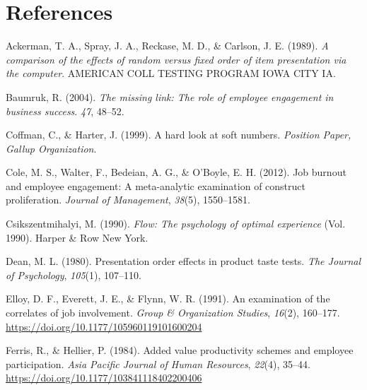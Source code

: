 \documentclass[
  man]{apa6}
\newlength{\cslhangindent}
\newlength{\cslentryspacingunit} %
\newenvironment{CSLReferences}[2] %
 {%
  \setlength{\parindent}{0pt}
  \ifodd #1
  \let\oldpar\par
  \def\par{\hangindent=\cslhangindent\oldpar}
  \fi
  \setlength{\parskip}{#2\cslentryspacingunit}
 }%
 {}
\begin{document}
\newpage

\hypertarget{references}{%
\section{References}\label{references}}

\begingroup
\setlength{\parindent}{-0.5in}
\setlength{\leftskip}{0.5in}

\hypertarget{refs}{}
\begin{CSLReferences}{1}{0}
\leavevmode{}%
Ackerman, T. A., Spray, J. A., Reckase, M. D., \& Carlson, J. E. (1989). \emph{A comparison of the effects of random versus fixed order of item presentation via the computer}. AMERICAN COLL TESTING PROGRAM IOWA CITY IA.

\leavevmode{}%
Baumruk, R. (2004). \emph{The missing link: The role of employee engagement in business success}. \emph{47}, 48--52.

\leavevmode{}%
Coffman, C., \& Harter, J. (1999). A hard look at soft numbers. \emph{Position Paper, Gallup Organization}.

\leavevmode{}%
Cole, M. S., Walter, F., Bedeian, A. G., \& O'Boyle, E. H. (2012). Job burnout and employee engagement: A meta-analytic examination of construct proliferation. \emph{Journal of Management}, \emph{38}(5), 1550--1581.

\leavevmode{}%
Csikszentmihalyi, M. (1990). \emph{Flow: The psychology of optimal experience} (Vol. 1990). Harper \& Row New York.

\leavevmode{}%
Dean, M. L. (1980). Presentation order effects in product taste tests. \emph{The Journal of Psychology}, \emph{105}(1), 107--110.

\leavevmode{}%
Elloy, D. F., Everett, J. E., \& Flynn, W. R. (1991). An examination of the correlates of job involvement. \emph{Group \& Organization Studies}, \emph{16}(2), 160--177. \url{https://doi.org/10.1177/105960119101600204}

\leavevmode{}%
Ferris, R., \& Hellier, P. (1984). Added value productivity schemes and employee participation. \emph{Asia Pacific Journal of Human Resources}, \emph{22}(4), 35--44. \url{https://doi.org/10.1177/103841118402200406}


\end{CSLReferences}
\end{document}
